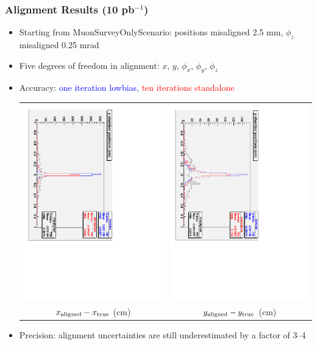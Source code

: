 \documentclass[compress]{beamer}
\begin{document}
\begin{frame}
\frametitle{Alignment Results (10 pb$^{-1}$)}
\begin{itemize}\setlength{\itemsep}{0.25 cm}
\item Starting from MuonSurveyOnlyScenario: positions misaligned 2.5 mm, $\phi_z$ misaligned 0.25 mrad

\item Five degrees of freedom in alignment: $x$, $y$, $\phi_x$, $\phi_y$, $\phi_z$

\item Accuracy: \textcolor{blue}{one iteration lowbias}, \textcolor{red}{ten iterations standalone}
\begin{center}
\begin{tabular}{c c}
\includegraphics[height=0.4\linewidth, angle=90]{realplots/x_positions} &
\includegraphics[height=0.4\linewidth, angle=90]{realplots/y_positions} \\
$x_{\mbox{\scriptsize aligned}} - x_{\mbox{\scriptsize true}}$ (cm) &
$y_{\mbox{\scriptsize aligned}} - y_{\mbox{\scriptsize true}}$ (cm)
\end{tabular}
\end{center}

\item Precision: alignment uncertainties are still underestimated by a factor of 3--4
\end{itemize}
\end{frame}
\end{document}
